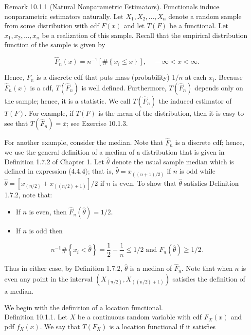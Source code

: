 Remark 10.1.1 (Natural Nonparametric Estimators). Functionals induce nonparametric estimators naturally. Let $X_{1}, X_{2}, \ldots, X_{n}$ denote a random sample from some distribution with cdf $F(x)$ and let $T(F)$ be a functional. Let $x_{1}, x_{2}, \ldots, x_{n}$ be a realization of this sample. Recall that the empirical distribution function of the sample is given by


\begin{equation*}
\widehat{F}_{n}(x)=n^{-1}\left[\#\left\{x_{i} \leq x\right\}\right], \quad-\infty<x<\infty . \tag{10.1.1}
\end{equation*}


Hence, $F_{n}$ is a discrete cdf that puts mass (probability) $1 / n$ at each $x_{i}$. Because $\widehat{F}_{n}(x)$ is a cdf, $T\left(\widehat{F}_{n}\right)$ is well defined. Furthermore, $T\left(\widehat{F}_{n}\right)$ depends only on the sample; hence, it is a statistic. We call $T\left(\widehat{F}_{n}\right)$ the induced estimator of $T(F)$. For example, if $T(F)$ is the mean of the distribution, then it is easy to see that $T\left(\widehat{F}_{n}\right)=\bar{x}$; see Exercise 10.1.3.

For another example, consider the median. Note that $\hat{F}_{n}$ is a discrete cdf; hence, we use the general definition of a median of a distribution that is given in Definition 1.7.2 of Chapter 1. Let $\hat{\theta}$ denote the usual sample median which is defined in expression (4.4.4); that is, $\hat{\theta}=x_{((n+1) / 2)}$ if $n$ is odd while $\hat{\theta}=\left[x_{(n / 2)}+x_{((n / 2)+1)}\right] / 2$ if $n$ is even. To show that $\hat{\theta}$ satisfies Definition 1.7.2, note that:

\begin{itemize}
  \item If $n$ is even, then $\hat{F}_{n}(\hat{\theta})=1 / 2$.
  \item If $n$ is odd then
\end{itemize}

$$
n^{-1} \#\left\{x_{i}<\hat{\theta}\right\}=\frac{1}{2}-\frac{1}{n} \leq 1 / 2 \text { and } F_{n}(\hat{\theta}) \geq 1 / 2 .
$$

Thus in either case, by Definition 1.7.2, $\hat{\theta}$ is a median of $\hat{F}_{n}$. Note that when $n$ is even any point in the interval $\left(X_{(n / 2)}, X_{((n / 2)+1)}\right)$ satisfies the definition of a median.

We begin with the definition of a location functional.\\
Definition 10.1.1. Let $X$ be a continuous random variable with cdf $F_{X}(x)$ and pdf $f_{X}(x)$. We say that $T\left(F_{X}\right)$ is a location functional if it satisfies


